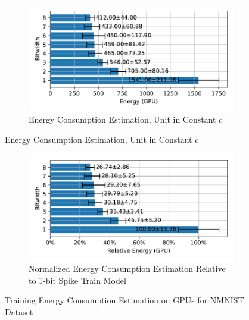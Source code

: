         \begin{figure}[H]
            \centering
            \begin{subfigure}[H]{0.6\textwidth}
                \includegraphics[width=\textwidth]{../standard/NMNIST/plots/nmnist_train_energy_gpu_horizontal.pdf}
                \caption{Energy Consumption Estimation, Unit in Constant $c$}
            \end{subfigure}
        \end{figure}
        \begin{figure}[H]
            \centering
            \ContinuedFloat
            \begin{subfigure}[H]{0.6\textwidth}
                \includegraphics[width=\textwidth]{../standard/NMNIST/plots/nmnist_train_relative_energy_gpu_horizontal.pdf}
                \caption{Normalized Energy Consumption Estimation Relative to 1-bit Spike Train Model}
            \end{subfigure}
            \caption{Training Energy Consumption Estimation on GPUs for NMNIST Dataset}
        \end{figure}

    \label{appendix:energy_gpu_dvs_gesture}


